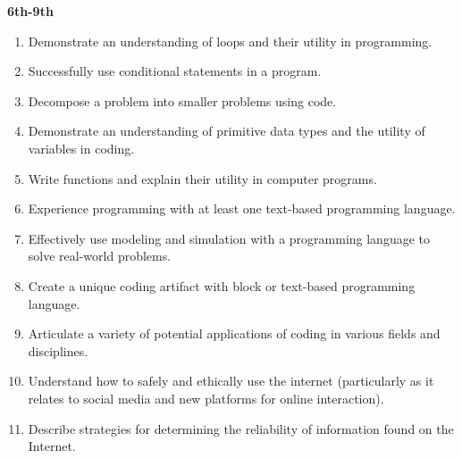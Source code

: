 \textbf{6th-9th}
\begin{enumerate}
	\item Demonstrate an understanding of loops and their utility in programming.
	\item Successfully use conditional statements in a program.
	\item Decompose a problem into smaller problems using code.
	\item Demonstrate an understanding of primitive data types and the utility of variables in coding.
	\item Write functions and explain their utility in computer programs.
	\item Experience programming with at least one text-based programming language.
	\item Effectively use modeling and simulation with a programming language to solve real-world problems.
	\item Create a unique coding artifact with block or text-based programming language.
	\item Articulate a variety of potential applications of coding in various fields and disciplines.
	\item Understand how to safely and ethically use the internet (particularly as it relates to social media and new platforms for online interaction).
	\item Describe strategies for determining the reliability of information found on the Internet.
\end{enumerate}

